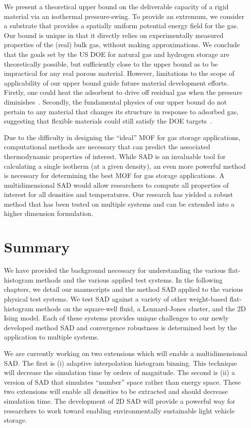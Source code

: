 We present a theoretical upper bound on the deliverable capacity of a
rigid material via an isothermal pressure-swing. To provide an extremum, we
consider a substrate that provides a spatially uniform potential energy field
for the gas. Our bound is unique in that it directly relies on experimentally
measured properties of the (real) bulk gas, without making approximations.
We conclude that the goals set by the US DOE for natural gas and hydrogen
storage are theoretically possible, but sufficiently close to the upper bound
as to be impractical for any real porous material. However, limitations to the
scope of applicability of our upper bound guide future material development 
efforts. Firstly, one could heat the adsorbent to drive off residual gas when
the pressure diminishes~\cite{gomez2014exploring}. Secondly, the fundamental
physics of our upper bound do not pertain to any material that changes its
structure in response to adsorbed gas, suggesting that flexible materials could
still satisfy the DOE targets~\cite{schneemann2014flexible, choi2008broadly, mason2015methane}.

Due to the difficulty in designing the ``ideal'' MOF for gas storage
applications, computational methods are necessary that can predict the
associated thermodynamic properties of interest. While SAD is an invaluable tool
for calculating a single isotherm (at a given density), an even more powerful
method is necessary for determining the best MOF for gas storage applications.
A multidimensional SAD would allow researchers to compute all properties of
interest for all densities and temperatures. Our research has
yielded a robust method that has been tested on multiple systems and can be
extended into a higher dimension formulation. 

\section{Summary}
We have provided the background necessary for understanding the various
flat-histogram methods and the various applied test systems. In the following
chapters, we detail our manuscripts and the method SAD applied to the various
physical test systems. We test SAD against a variety of other weight-based
flat-histogram methods on the square-well fluid, a Lennard-Jones cluster, and
the 2D Ising model. Each of these systems provides unique challenges to our
newly developed method SAD and convergence robustness is determined best by the
application to multiple systems.

We are currently working on two extensions which will enable a multidimensional
SAD. The first is (i) adaptive interpolation histogram binning. This technique
will decrease the simulation time by orders of magnitude. The second is (ii) a
version of SAD that simulates ``number'' space rather than energy space. These
two extensions will enable all densities to be extracted and should decrease
simulation time. The development of 2D SAD will provide a powerful way for
researchers to work toward enabling environmentally sustainable light vehicle
storage.